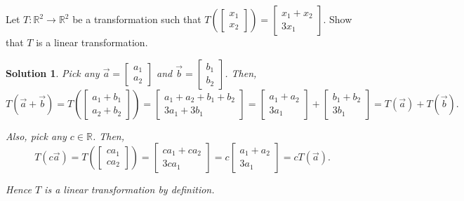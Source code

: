 \documentclass[]{book}
\newcommand{\nextline}{\hspace*{0pt}\newline}
\newcommand{\vecxx}[1][x]{\ensuremath{\begin{bmatrix}
#1_1 \\
#1_2
\end{bmatrix}}}
\newtheorem*{solution}{Solution}
\begin{document}
\begin{example}
    \nextline
    Let $T:\mathbb{R}^2 \to \mathbb{R}^2$ be a transformation such that $T\left(\vecxx\right) = \begin{bmatrix}x_1 + x_2 \\ 3x_1\end{bmatrix}$. Show that $T$ is a linear transformation.
\begin{solution}
    Pick any $\vec{a}=\begin{bmatrix}a_1 \\ a_2\end{bmatrix}$ and $\vec{b}=\begin{bmatrix}b_1 \\ b_2\end{bmatrix}$. Then, \[T(\vec{a} + \vec{b}) = T\left(\begin{bmatrix}a_1 + b_1 \\ a_2 + b_2\end{bmatrix}\right) = \begin{bmatrix}a_1 + a_2 + b_1 + b_2 \\ 3a_1 + 3b_1 \end{bmatrix} = \begin{bmatrix}a_1 + a_2 \\ 3a_1\end{bmatrix} + \begin{bmatrix}b_1 + b_2 \\ 3b_1\end{bmatrix} = T(\vec{a}) + T(\vec{b}).\]
    
    Also, pick any $c \in \mathbb{R}$. Then,
    \[T(c\vec{a}) = T\left(\begin{bmatrix}ca_1 \\ ca_2\end{bmatrix}\right) = \begin{bmatrix}ca_1 + ca_2 \\ 3ca_1\end{bmatrix} = c\begin{bmatrix}a_1 + a_2 \\ 3a_1\end{bmatrix} = cT(\vec{a}).\]
    
    Hence $T$ is a linear transformation by definition. \hfill \qedsymbol
\end{solution}
\end{example}
\end{document}
